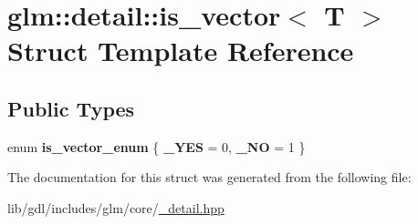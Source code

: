 \hypertarget{structglm_1_1detail_1_1is__vector}{}\section{glm\+:\+:detail\+:\+:is\+\_\+vector$<$ T $>$ Struct Template Reference}
\label{structglm_1_1detail_1_1is__vector}
\subsection*{Public Types}
\begin{DoxyCompactItemize}
\item 
\hypertarget{structglm_1_1detail_1_1is__vector_aa3349af81e33e41539f154050f4bde4d}{}enum {\bfseries is\+\_\+vector\+\_\+enum} \{ {\bfseries \+\_\+\+Y\+E\+S} = 0, 
{\bfseries \+\_\+\+N\+O} = 1
 \}\label{structglm_1_1detail_1_1is__vector_aa3349af81e33e41539f154050f4bde4d}

\end{DoxyCompactItemize}


The documentation for this struct was generated from the following file\+:\begin{DoxyCompactItemize}
\item 
lib/gdl/includes/glm/core/\hyperlink{__detail_8hpp}{\+\_\+detail.\+hpp}\end{DoxyCompactItemize}
